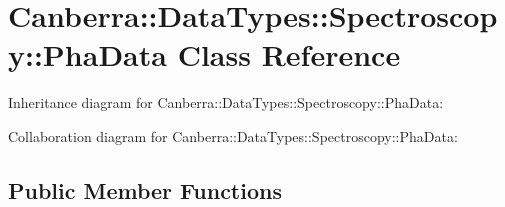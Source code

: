 \hypertarget{class_canberra_1_1_data_types_1_1_spectroscopy_1_1_pha_data}{}\section{Canberra\+:\+:Data\+Types\+:\+:Spectroscopy\+:\+:Pha\+Data Class Reference}
\label{class_canberra_1_1_data_types_1_1_spectroscopy_1_1_pha_data}


Inheritance diagram for Canberra\+:\+:Data\+Types\+:\+:Spectroscopy\+:\+:Pha\+Data\+:


Collaboration diagram for Canberra\+:\+:Data\+Types\+:\+:Spectroscopy\+:\+:Pha\+Data\+:
\subsection*{Public Member Functions}
